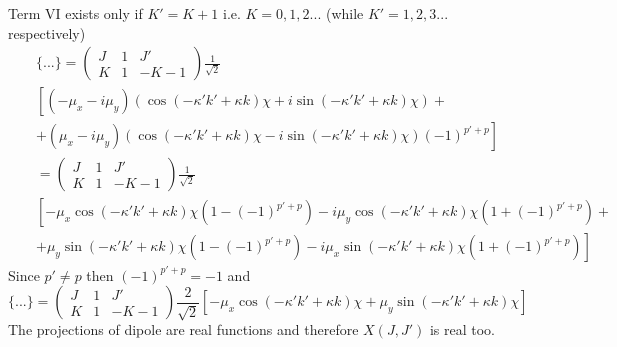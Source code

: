 Term VI exists only if $K' = K +1$  i.e. $K = 0, 1, 2...$ (while $K' = 1, 2, 3...$ respectively)
\begin{eqnarray} \nonumber
&& \{...\} = 
\left( \begin{array}{ccc} 
 J &  1 &  J' \\
 K &  1 & -K-1  \end{array} \right)
\frac{1}{\sqrt{2}} \\ \nonumber
&& \left[ ( -\mu_x - i \mu_y) 
\left( \cos ( -\kappa' k' + \kappa k) \chi + i \sin ( -\kappa' k' + \kappa k) \chi \right) + \right. \\ 
&& \left.
+ ( \mu_x - i \mu_y)
\left( \cos ( -\kappa' k' + \kappa k) \chi - i \sin ( -\kappa' k' + \kappa k) \chi \right) (-1)^{p'+p}
\right] \\ \nonumber
&&  = 
\left( \begin{array}{ccc} 
 J &  1 &  J' \\
 K &  1 & -K-1  \end{array} \right)
\frac{1}{\sqrt{2}} \\ \nonumber
&& \left[ 
-  \mu_x \cos ( -\kappa' k' + \kappa k) \chi \left( 1- (-1)^{p'+p} \right)
-i \mu_y \cos ( -\kappa' k' + \kappa k) \chi \left( 1+ (-1)^{p'+p} \right) + \right. \\ 
&& \left.
+  \mu_y \sin ( -\kappa' k' + \kappa k) \chi \left( 1- (-1)^{p'+p} \right)
-i \mu_x \sin ( -\kappa' k' + \kappa k) \chi \left( 1+ (-1)^{p'+p} \right) \right]
\end{eqnarray}
Since $p' \ne p$ then $(-1)^{p'+p} = -1$ and
\begin{equation}
\{...\} = 
\left( \begin{array}{ccc} 
 J &  1 &  J' \\
 K &  1 & -K-1  \end{array} \right)
\frac{2}{\sqrt{2}} \left[
- \mu_x \cos ( -\kappa' k' + \kappa k) \chi +  \mu_y \sin ( -\kappa' k' + \kappa k) \chi \right]
\end{equation}
The projections of dipole are real functions and therefore $X(J,J')$ is real too.

